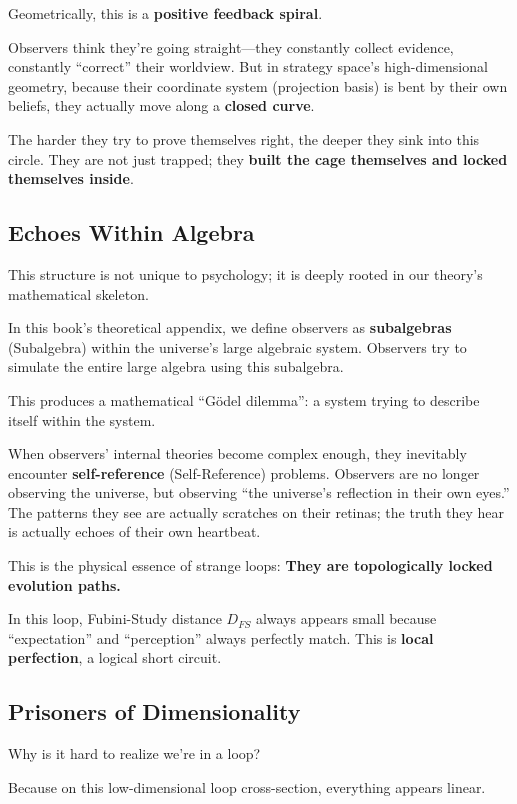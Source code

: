 Geometrically, this is a \textbf{positive feedback spiral}.

Observers think they're going straight---they constantly collect evidence, constantly ``correct'' their worldview. But in strategy space's high-dimensional geometry, because their coordinate system (projection basis) is bent by their own beliefs, they actually move along a \textbf{closed curve}.

The harder they try to prove themselves right, the deeper they sink into this circle. They are not just trapped; they \textbf{built the cage themselves and locked themselves inside}.

\subsection{Echoes Within Algebra}

This structure is not unique to psychology; it is deeply rooted in our theory's mathematical skeleton.

In this book's theoretical appendix, we define observers as \textbf{subalgebras} (Subalgebra) within the universe's large algebraic system. Observers try to simulate the entire large algebra using this subalgebra.

This produces a mathematical ``Gödel dilemma'': a system trying to describe itself within the system.

When observers' internal theories become complex enough, they inevitably encounter \textbf{self-reference} (Self-Reference) problems. Observers are no longer observing the universe, but observing ``the universe's reflection in their own eyes.'' The patterns they see are actually scratches on their retinas; the truth they hear is actually echoes of their own heartbeat.

This is the physical essence of strange loops: \textbf{They are topologically locked evolution paths.}

In this loop, Fubini-Study distance $D_{FS}$ always appears small because ``expectation'' and ``perception'' always perfectly match. This is \textbf{local perfection}, a logical short circuit.

\subsection{Prisoners of Dimensionality}

Why is it hard to realize we're in a loop?

Because on this low-dimensional loop cross-section, everything appears linear.

